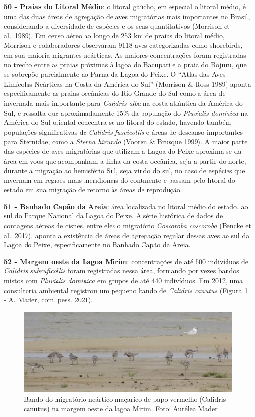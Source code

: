 \documentclass[
  oneside]{scrbook}
\begin{document}
\textbf{50 - Praias do Litoral Médio}: o litoral gaúcho, em especial o litoral médio, é uma das duas áreas de agregação de aves migratórias mais importantes no Brasil, considerando a diversidade de espécies e os seus quantitativos (Morrison et al.~1989). Em censo aéreo ao longo de 253 km de praias do litoral médio, Morrison e colaboradores observaram 9118 aves categorizadas como shorebirds, em sua maioria migrantes neárticas. As maiores concentrações foram registradas no trecho entre as praias próximas à lagoa do Bacupari e a praia do Bojuru, que se sobrepõe parcialmente ao Parna da Lagoa do Peixe. O ``Atlas das Aves Limícolas Neárticas na Costa da América do Sul'' (Morrison \& Ross 1989) aponta especificamente as praias oceânicas do Rio Grande do Sul como a área de invernada mais importante para \emph{Calidris alba} na costa atlântica da América do Sul, e ressalta que aproximadamente 15\% da população do \emph{Pluvialis dominica} na América do Sul oriental concentra-se no litoral do estado, havendo também populações significativas de \emph{Calidris fuscicollis} e áreas de descanso importantes para Sternidae, como a \emph{Sterna hirundo} (Vooren \& Brusque 1999). A maior parte das espécies de aves migratórias que utilizam a Lagoa do Peixe aproxima-se da área em voos que acompanham a linha da costa oceânica, seja a partir do norte, durante a migração ao hemisfério Sul, seja vindo do sul, no caso de espécies que invernam em regiões mais meridionais do continente e passam pelo litoral do estado em sua migração de retorno às áreas de reprodução.

\textbf{51 - Banhado Capão da Areia}: área localizada no litoral médio do estado, ao sul do Parque Nacional da Lagoa do Peixe. A série histórica de dados de contagens aéreas de cisnes, entre eles o migratório \emph{Coscoroba coscoroba} (Bencke et al.~2017), aponta a existência de áreas de agregação regular dessas aves ao sul da Lagoa do Peixe, especificamente no Banhado Capão da Areia.

\textbf{52 - Margem oeste da Lagoa Mirim}: concentrações de até 500 indivíduos de \emph{Calidris subruficollis} foram registradas nessa área, formando por vezes bandos mistos com \emph{Pluvialis dominica} em grupos de até 440 indivíduos. Em 2012, uma consultoria ambiental registrou um pequeno bando de \emph{Calidris canutus} (Figura \ref{fig:27} - A. Mader, com. pess. 2021).

\begin{figure}[H]

{\centering \includegraphics[width=0.75\linewidth]{imagens/cap07/Figura_7.7} 

}

\caption{Bando do migratório neártico maçarico-de-papo-vermelho (Calidris canutus) na margem oeste da lagoa Mirim. Foto: Aurélea Mader}\label{fig:27}
\end{figure}
\end{document}
